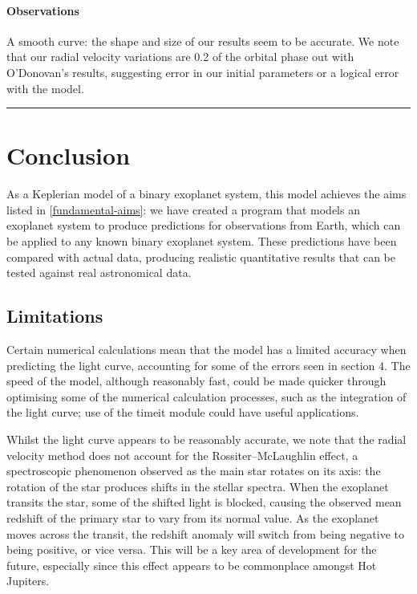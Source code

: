 \documentclass[11pt]{article}
\begin{document}
    \hypertarget{observations}{%
\paragraph{Observations}\label{observations_4}}

A smooth curve: the shape and size of our results seem to be accurate.
We note that our radial velocity variations are 0.2 of the orbital phase
out with O'Donovan's results, suggesting error in our initial parameters
or a logical error with the model.\\

\begin{center}\rule{0.5\linewidth}{0.5pt}\end{center}

    \hypertarget{conclusion}{%
\section{Conclusion}\label{conclusion}}



As a Keplerian model of a binary exoplanet system, this model achieves
the aims listed in \ref{fundamental-aims}: we have created a program that models an exoplanet system to produce predictions for observations from Earth, which can be applied to any known binary exoplanet system. These predictions have been compared with actual data, producing realistic quantitative results that can be tested against real astronomical data.

\hypertarget{limitations}{%
\subsection{Limitations}\label{limitations}}

Certain numerical calculations mean that the model has a limited
accuracy when predicting the light curve, accounting for some of the
errors seen in section 4. The speed of the model, although reasonably
fast, could be made quicker through optimising some of the numerical
calculation processes, such as the integration of the light curve; use
of the timeit module could have useful applications.

Whilst the light curve appears to be reasonably accurate, we note that
the radial velocity method does not account for the Rossiter--McLaughlin
effect, a spectroscopic phenomenon observed as the main star rotates on
its axis: the rotation of the star produces shifts in the stellar
spectra. When the exoplanet transits the star, some of the shifted light
is blocked, causing the observed mean redshift of the primary star to
vary from its normal value. As the exoplanet moves across the transit,
the redshift anomaly will switch from being negative to being positive,
or vice versa. This will be a key area of development for the future,
especially since this effect appears to be commonplace amongst Hot
Jupiters.
\end{document}
